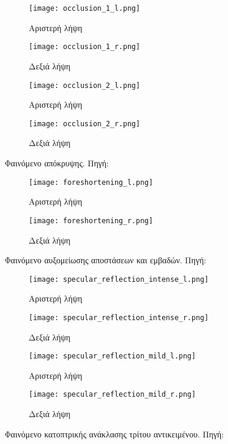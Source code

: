 \begin{figure}
	\centering
	\begin{subfigure}{.49\textwidth}
		\texttt{[image: occlusion\_1\_l.png]}
		\caption{Αριστερή λήψη}
	\end{subfigure}
	\begin{subfigure}{.49\textwidth}
		\texttt{[image: occlusion\_1\_r.png]}
		\caption{Δεξιά λήψη}
	\end{subfigure}
	
	\begin{subfigure}{.49\textwidth}
		\texttt{[image: occlusion\_2\_l.png]}
		\caption{Αριστερή λήψη}
	\end{subfigure}
	\begin{subfigure}{.49\textwidth}
		\texttt{[image: occlusion\_2\_r.png]}
		\caption{Δεξιά λήψη}
	\end{subfigure}
	\caption{Φαινόμενο απόκρυψης. Πηγή: \citep{TUMLesson}}
	\label{fig:occlusion1}
\end{figure}

\begin{figure}
	\centering
	\begin{subfigure}{.49\textwidth}
		\texttt{[image: foreshortening\_l.png]}
		\caption{Αριστερή λήψη}
	\end{subfigure}
	\begin{subfigure}{.49\textwidth}
		\texttt{[image: foreshortening\_r.png]}
		\caption{Δεξιά λήψη}
	\end{subfigure}
	\caption{Φαινόμενο αυξομείωσης αποστάσεων και εμβαδών. Πηγή: \citep{TUMLesson}}
	\label{fig:foreshortening}
\end{figure}

\begin{figure}
	\centering
	\begin{subfigure}{.49\textwidth}
		\texttt{[image: specular\_reflection\_intense\_l.png]}
		\caption{Αριστερή λήψη}
	\end{subfigure}
	\begin{subfigure}{.49\textwidth}
		\texttt{[image: specular\_reflection\_intense\_r.png]}
		\caption{Δεξιά λήψη}
	\end{subfigure}
	
	\begin{subfigure}{.49\textwidth}
		\texttt{[image: specular\_reflection\_mild\_l.png]}
		\caption{Αριστερή λήψη}
	\end{subfigure}
	\begin{subfigure}{.49\textwidth}
		\texttt{[image: specular\_reflection\_mild\_r.png]}
		\caption{Δεξιά λήψη}
	\end{subfigure}
	\caption{Φαινόμενο κατοπτρικής ανάκλασης τρίτου αντικειμένου. Πηγή: \citep{TUMLesson}}
	\label{fig:specular_reflection}
\end{figure}

